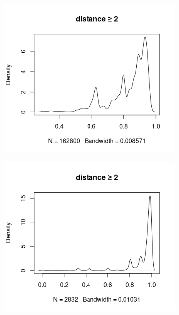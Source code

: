 \documentclass{l4proj}
\theoremstyle{definition}
\theoremstyle{remark}
\begin{document}
\begin{figure}
  \centering
  \begin{subfigure}[t]{0.49\textwidth}
    \centering
    \includegraphics[width=\textwidth]{images/mcs_prop2.png}
  \end{subfigure}
  \begin{subfigure}[t]{0.49\textwidth}
    \centering
    \includegraphics[width=\textwidth]{images/sip_prop2.png}
  \end{subfigure}

\end{figure}
\end{document}
